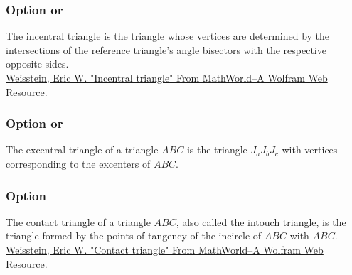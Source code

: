 \subsubsection{Option  or  }

The incentral triangle is the triangle whose vertices are determined by
the intersections of the reference triangle’s angle bisectors with the
respective opposite sides.\\
\href{http://mathworld.wolfram.com/ContactTriangle.html}{Weisstein, Eric W. "Incentral triangle" From MathWorld--A Wolfram Web Resource.}


\begin{tkzexample}[latex=7cm,small]
\end{tkzexample}

\subsubsection{Option  or  }

The excentral triangle of a triangle $ABC$ is the triangle $J_aJ_bJ_c$ with vertices corresponding to the excenters of $ABC$.

\begin{tkzexample}[latex=7cm,small]
\end{tkzexample}


\subsubsection{Option }
The contact triangle of a triangle $ABC$, also called the intouch triangle, is the triangle  formed by the points of tangency of the incircle of $ABC$ with $ABC$.\\
\href{http://mathworld.wolfram.com/ContactTriangle.html}{Weisstein, Eric W. "Contact triangle" From MathWorld--A Wolfram Web Resource.}

